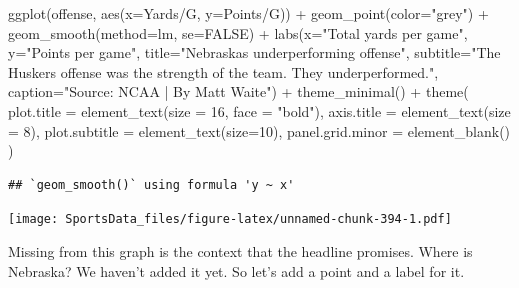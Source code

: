\documentclass[
]{book}
\newenvironment{Shaded}{\begin{snugshade}}{\end{snugshade}}
\newcommand{\AttributeTok}[1]{\textcolor[rgb]{0.77,0.63,0.00}{#1}}
\newcommand{\ConstantTok}[1]{\textcolor[rgb]{0.00,0.00,0.00}{#1}}
\newcommand{\DecValTok}[1]{\textcolor[rgb]{0.00,0.00,0.81}{#1}}
\newcommand{\FunctionTok}[1]{\textcolor[rgb]{0.00,0.00,0.00}{#1}}
\newcommand{\NormalTok}[1]{#1}
\newcommand{\SpecialCharTok}[1]{\textcolor[rgb]{0.00,0.00,0.00}{#1}}
\newcommand{\StringTok}[1]{\textcolor[rgb]{0.31,0.60,0.02}{#1}}
\begin{document}
\begin{Shaded}
\begin{Highlighting}[]
\FunctionTok{ggplot}\NormalTok{(offense, }\FunctionTok{aes}\NormalTok{(}\AttributeTok{x=}\StringTok{\textasciigrave{}}\AttributeTok{Yards/G}\StringTok{\textasciigrave{}}\NormalTok{, }\AttributeTok{y=}\StringTok{\textasciigrave{}}\AttributeTok{Points/G}\StringTok{\textasciigrave{}}\NormalTok{)) }\SpecialCharTok{+} 
  \FunctionTok{geom\_point}\NormalTok{(}\AttributeTok{color=}\StringTok{"grey"}\NormalTok{) }\SpecialCharTok{+} \FunctionTok{geom\_smooth}\NormalTok{(}\AttributeTok{method=}\NormalTok{lm, }\AttributeTok{se=}\ConstantTok{FALSE}\NormalTok{) }\SpecialCharTok{+} 
  \FunctionTok{labs}\NormalTok{(}\AttributeTok{x=}\StringTok{"Total yards per game"}\NormalTok{, }\AttributeTok{y=}\StringTok{"Points per game"}\NormalTok{, }\AttributeTok{title=}\StringTok{"Nebraska\textquotesingle{}s underperforming offense"}\NormalTok{, }\AttributeTok{subtitle=}\StringTok{"The Husker\textquotesingle{}s offense was the strength of the team. They underperformed."}\NormalTok{, }\AttributeTok{caption=}\StringTok{"Source: NCAA | By Matt Waite"}\NormalTok{) }\SpecialCharTok{+} 
  \FunctionTok{theme\_minimal}\NormalTok{() }\SpecialCharTok{+} 
  \FunctionTok{theme}\NormalTok{(}
    \AttributeTok{plot.title =} \FunctionTok{element\_text}\NormalTok{(}\AttributeTok{size =} \DecValTok{16}\NormalTok{, }\AttributeTok{face =} \StringTok{"bold"}\NormalTok{),}
    \AttributeTok{axis.title =} \FunctionTok{element\_text}\NormalTok{(}\AttributeTok{size =} \DecValTok{8}\NormalTok{), }
    \AttributeTok{plot.subtitle =} \FunctionTok{element\_text}\NormalTok{(}\AttributeTok{size=}\DecValTok{10}\NormalTok{), }
    \AttributeTok{panel.grid.minor =} \FunctionTok{element\_blank}\NormalTok{()}
\NormalTok{    ) }
\end{Highlighting}
\end{Shaded}

\begin{verbatim}
## `geom_smooth()` using formula 'y ~ x'
\end{verbatim}

\texttt{[image: SportsData\_files/figure-latex/unnamed-chunk-394-1.pdf]}

Missing from this graph is the context that the headline promises. Where is Nebraska? We haven't added it yet. So let's add a point and a label for it.
\end{document}
